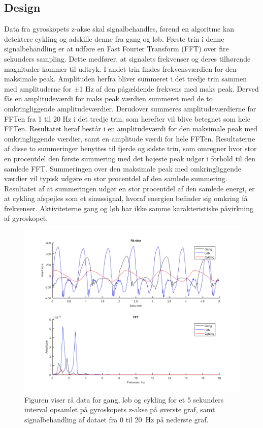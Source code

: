 \subsection{Design}\label{design_cykling}
Data fra gyroskopets z-akse skal signalbehandles, førend en algoritme kan detektere cykling og adskille denne fra gang og løb. Første trin i denne signalbehandling er at udføre en Fast Fourier Transform (FFT) over fire sekunders sampling. Dette medfører, at signalets frekvenser og deres tilhørende magnituder kommer til udtryk. I andet trin findes frekvensværdien for den maksimale peak. Amplituden herfra bliver summeret i det tredje trin sammen med amplituderne for $\pm$1 Hz af den pågældende frekvens med maks peak. Derved fås en amplitudeværdi for maks peak værdien summeret med de to omkringliggende amplitudeværdier. Derudover summeres amplitudeværdierne for FFTen fra 1 til 20 Hz i det tredje trin, som herefter vil blive betegnet som hele FFTen. Resultatet heraf består i en amplitudeværdi for den maksimale peak med omkringliggende værdier, samt en amplitude værdi for hele FFTen. Resultaterne af disse to summeringer benyttes til fjerde og sidste trin, som omregner hvor stor en procentdel den første summering med det højeste peak udgør i forhold til den samlede FFT. Summeringen over den maksimale peak med omkringliggende værdier vil typisk udgøre en stor procentdel af den samlede summering. Resultatet af at summeringen udgør en stor procentdel af den samlede energi, er at cykling afspejles som et sinussignal, hvoraf energien befinder sig omkring få frekvenser. Aktiviteterne gang og løb har ikke samme karakteristiske påvirkning af gyroskopet.
\begin{figure}[H]
	\centering
	\includegraphics[scale=0.8]{figures/cDesign/gyro_behandling.png}
	\caption{Figuren viser rå data for gang, løb og cykling for et 5 sekunders interval opsamlet på gyroskopets z-akse på øverste graf, samt signalbehandling af dataet fra 0 til 20~Hz på nederste graf.}
	\label{fig:gyro_behandling}
\end{figure}\vspace{-0.5cm}

